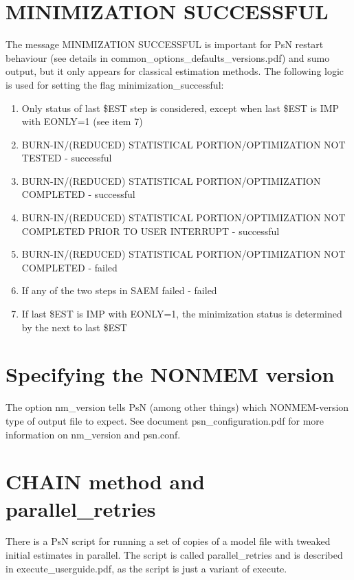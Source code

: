 \documentclass[a4paper,12pt]{article}
\begin{document}
\section{MINIMIZATION SUCCESSFUL}

The message MINIMIZATION SUCCESSFUL is important for PsN restart behaviour (see details in common\_options\_defaults\_versions.pdf) and sumo output, but it only appears for classical estimation methods. The following logic is used for setting the flag minimization\_successful:

\begin{enumerate}
\item Only status of last \$EST step is considered, except when last \$EST is IMP with EONLY=1 (see item 7)
\item BURN-IN/(REDUCED) STATISTICAL PORTION/OPTIMIZATION NOT TESTED - successful
\item BURN-IN/(REDUCED) STATISTICAL PORTION/OPTIMIZATION COMPLETED - successful
\item BURN-IN/(REDUCED) STATISTICAL PORTION/OPTIMIZATION NOT COMPLETED PRIOR TO USER INTERRUPT - successful
\item BURN-IN/(REDUCED) STATISTICAL PORTION/OPTIMIZATION NOT COMPLETED - failed
\item If any of the two steps in SAEM failed - failed 
\item If last \$EST is IMP with EONLY=1, the minimization status is determined by the next to last \$EST
\end{enumerate}

\section{Specifying the NONMEM version}

The option nm\_version tells PsN (among other things) which NONMEM-version type of output file to expect. See document psn\_configuration.pdf for more information on nm\_version and psn.conf.

\section{CHAIN method and parallel\_retries}

There is a PsN script for running a set of copies of a model file with tweaked initial estimates in parallel. The script is called parallel\_retries and is described in execute\_userguide.pdf, as the script is just a variant of execute.
\end{document}
